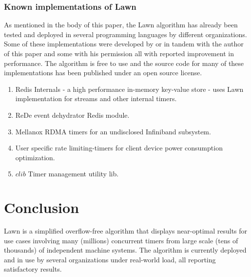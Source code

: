 \documentclass[acmsmall]{acmart} %
\begin{document}
\subsubsection{Known implementations of Lawn}
As mentioned in the body of this paper, the Lawn algorithm has already been tested and deployed in several programming languages by different organizations. Some of these implementations were developed by or in tandem with the author of this paper and some with his permission all with reported improvement in performance. The algorithm is free to use and the source code for many of these implementations has been published under an open source license.
\begin{enumerate}
	\item Redis Internals \cite{Redis} - a high performance in-memory key-value store - uses Lawn implementation for streams and other internal timers.
	\item ReDe event dehydrator Redis module\cite{REDE}.
	\item Mellanox RDMA timers for an undisclosed Infiniband subsystem.
	\item User specific rate limiting-timers for client device power consumption optimization\cite{VUSR}.
	\item $clib$ Timer management utility lib.
\end{enumerate}



\section{Conclusion}
Lawn is a simplified overflow-free algorithm that displays near-optimal results for use cases involving many (millions) concurrent timers from large scale (tens of thousands) of independent machine systems. 
The algorithm is currently deployed and in use by several organizations under real-world load, all reporting satisfactory results.




\end{document}
